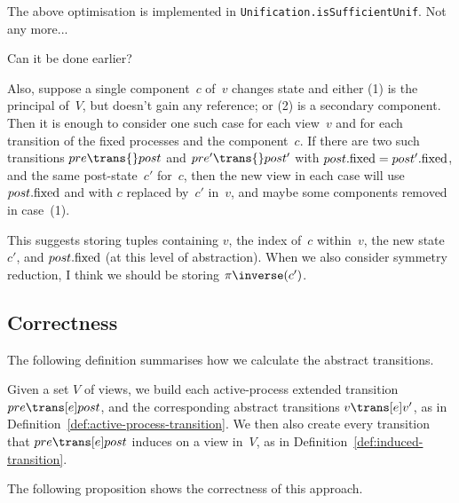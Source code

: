 \begin{impNote}
The above optimisation is implemented in
\texttt{Unification.isSufficientUnif}.  Not any more...
\end{impNote}

\begin{improve}
Can it be done earlier?  

Also, suppose a single component~$c$ of~$v$ changes state and either (1) is
the principal of~$V$, but doesn't gain any reference; or (2) is a secondary
component.  Then it is enough to consider one such case for each view~$v$ and
for each transition of the fixed processes and the component~$c$.  If there
are two such transitions $pre \trans{} post$ and $pre' \trans{} post'$ with
$post.\mathrm{fixed} = post'.\mathrm{fixed}$, and the same post-state~$c'$ for~$c$, then the
new view in each case will use $post.\mathrm{fixed}$ and with $c$ replaced by~$c'$
in~$v$, and maybe some components removed in case~(1).

This suggests storing tuples containing $v$, the index of~$c$ within~$v$, the
new state~$c'$, and $post.\mathrm{fixed}$ (at this level of abstraction).  When we
also consider symmetry reduction, I think we should be storing
$\pi\inverse(c')$. 

\end{improve}



\subsection{Correctness}
\label{sec:views-correctness}


The following definition summarises how we calculate the abstract transitions.

\begin{definition}
\label{def:abstract-transition}
Given a set $V$ of views, we build each active-process extended transition
$pre \trans[e] post$, and the corresponding abstract transitions $v \trans[e]
v'$, as in Definition~\ref{def:active-process-transition}.
%
We then also create every transition that $pre \trans[e] post$ induces on a
view in~$V$, as in Definition~\ref{def:induced-transition}. 
\end{definition}
%
%

The following proposition shows the correctness of this approach. 

